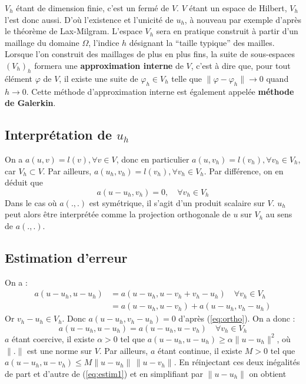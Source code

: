 %
$V_h$ étant de dimension finie, c'est un fermé de $V$. $V$ étant un
espace de Hilbert, $V_h$ l'est donc aussi. D'où l'existence et l'unicité
de $u_h$, \`a nouveau par exemple d'après le théorème de
Lax-Milgram.\saut
%
L'espace $V_h$ sera en pratique construit \`a partir d'un maillage du domaine
$\Omega$, l'indice $h$ désignant la ``taille typique'' des mailles. Lorsque
l'on construit des maillages de plus en plus fins, la suite de sous-espaces
$(V_h)_h$ formera une {\bf approximation interne} de $V$, c'est \`a dire que,
pour tout élément $\varphi$ de $V$, il existe une suite de $\varphi_h\in
V_h$ telle que $\|\varphi-\varphi_h\|\longrightarrow 0$ quand
$h\longrightarrow 0$. Cette méthode d'approximation interne est également
appelée {\bf méthode de Galerkin}.
%
%
\subsection{Interprétation de $u_h$}
%
\noindent
%
On a $a(u,v)=l(v), \forall v\in V$, donc en particulier $a(u,v_h)=l(v_h),
\forall v_h\in V_h$, car $V_h\subset V$. Par ailleurs, $a(u_h,v_h)=l(v_h),
\forall v_h\in V_h$. Par différence, on en déduit que
\begin{equation}
  a(u-u_h,v_h)=0,\quad \forall v_h\in V_h
  \label{eq:ortho}
\end{equation}
%
Dans le cas où $a(.,.)$ est symétrique, il s'agit d'un produit scalaire
sur $V$. $u_h$ peut alors être interprétée comme la projection
orthogonale de $u$ sur $V_h$ au sens de $a(.,.)$.
%
%
\subsection{Estimation d'erreur}
\label{sec:estim}
%
\noindent
%
On a :
$$
\begin{array}{ll}
a(u-u_h,u-u_h) & = a(u-u_h,u-v_h+v_h-u_h) \quad\forall v_h\in V_h\\
 & =a(u-u_h,u-v_h) + a(u-u_h,v_h-u_h)
\end{array}
$$
%
Or $v_h-u_h \in V_h$. Donc $a(u-u_h,v_h-u_h)=0$ d'après (\ref{eq:ortho}).
On a donc :
\begin{equation}
  a(u-u_h,u-u_h) = a(u-u_h,u-v_h) \quad\forall v_h\in V_h
 \label{eq:estim1}
\end{equation}
%
$a$ étant coercive, il existe $\alpha > 0$ tel que $a(u-u_h,u-u_h) \ge
\alpha \|u-u_h\|^2$, où $\|.\|$ est une norme sur $V$. Par ailleurs, $a$
étant continue, il existe $M > 0$ tel que $a(u-u_h,u-v_h)\le M \|u-u_h\| \,
\|u-v_h\|$. En réinjectant ces deux inégalités de part et d'autre de
(\ref{eq:estim1}) et en simplifiant par $\|u-u_h\|$ on obtient

